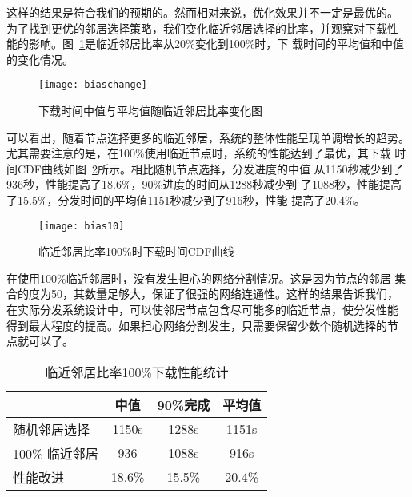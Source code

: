 这样的结果是符合我们的预期的。然而相对来说，优化效果并不一定是最优的。
为了找到更优的邻居选择策略，我们变化临近邻居选择的比率，并观察对下载性
能的影响。图~\ref{fig:biaschange}是临近邻居比率从20\%变化到100\%时，下
载时间的平均值和中值的变化情况。

\begin{figure}[htbp]
  \centering
  \begin{minipage}{0.6\linewidth}
    \centering
    \texttt{[image: biaschange]}
    \caption{下载时间中值与平均值随临近邻居比率变化图}
    \label{fig:biaschange}
  \end{minipage}
\end{figure}

可以看出，随着节点选择更多的临近邻居，系统的整体性能呈现单调增长的趋势。
尤其需要注意的是，在100\%使用临近节点时，系统的性能达到了最优，其下载
时间CDF曲线如图~\ref{fig:bias10}所示。相比随机节点选择，分发进度的中值
从1150秒减少到了936秒，性能提高了18.6\%，90\%进度的时间从1288秒减少到
了1088秒，性能提高了15.5\%，分发时间的平均值1151秒减少到了916秒，性能
提高了20.4\%。

\begin{figure}[htbp]
  \centering
  \begin{minipage}{0.6\linewidth}
    \centering
    \texttt{[image: bias10]}
    \caption{临近邻居比率100\%时下载时间CDF曲线}
    \label{fig:bias10}
  \end{minipage}
\end{figure}

在使用100\%临近邻居时，没有发生担心的网络分割情况。这是因为节点的邻居
集合的度为50，其数量足够大，保证了很强的网络连通性。这样的结果告诉我们，
在实际分发系统设计中，可以使邻居节点包含尽可能多的临近节点，使分发性能
得到最大程度的提高。如果担心网络分割发生，只需要保留少数个随机选择的节
点就可以了。

\begin{table}[htbp]
\centering
\begin{minipage}{0.8\linewidth}
\centering
\caption{临近邻居比率100\%下载性能统计}
\label{tbl:bias10}
\begin{tabular}{lccc}

\toprule[1.5pt]
              & 中值 & 90\%完成 & 平均值\\
\midrule[1pt]
随机邻居选择  & 1150s & 1288s & 1151s\\
100\% 临近邻居 & 936 & 1088s & 916s\\
性能改进      & 18.6\% & 15.5\% & 20.4\%\\
\bottomrule[1.5pt]
\end{tabular}
\end{minipage}
\end{table}

